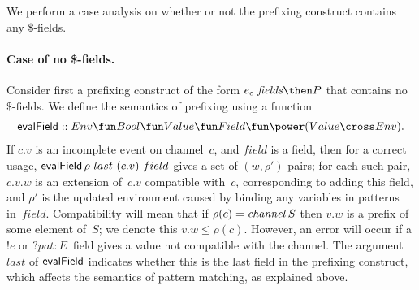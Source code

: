   We perform a case analysis on whether or not the prefixing construct
  contains any \$-fields.


\paragraph{Case of no \$-fields.} 

Consider first a prefixing construct of the form ${e_c~{\it fields} \then P}$
that contains no $\$$-fields.  We define the semantics of prefixing using a
function
\[
  \evalField :: 
    \begin{align}
    Env \fun Bool \fun Value \fun Field \fun  \power (Value \cross Env).
    \end{align}
\]
If $c.v$ is an incomplete event on channel~$c$, and $field$ is a field, then
for a correct usage, $\mathop{\sf evalField} \rho~last~(c.v)~field$ gives a set of
$(w,\rho')$ pairs; for each such pair, $c.v.w$ is an extension of~$c.v$
compatible with~$c$, corresponding to adding this field, and $\rho'$ is the
updated environment caused by binding any variables in patterns in~$field$.
Compatibility will mean that if $\rho(c) = \mathop{\it channel} S$ then $v.w$ is a prefix
of some element of~$S$; we denote this $v.w \le \rho(c)$.  However, an error
will occur if a $!e$ or $?pat:E$~field gives a value not compatible with the
channel.  The argument~$last$ of $\mathop{\sf evalField}$ indicates whether this is the
last field in the prefixing construct, which affects the semantics of pattern
matching, as explained above.


